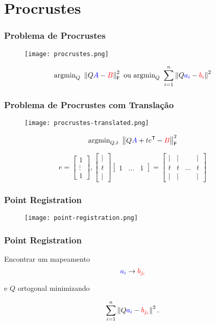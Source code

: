
\section{Procrustes}

\begin{frame}[fragile]
  \frametitle{Problema de Procrustes}
  \begin{figure}
    \centering
    \texttt{[image: procrustes.png]}
  \end{figure}

  \[\text{argmin}_{Q}\,\, \left\lVert Q\textcolor{blue}{A} - \textcolor{red}{B}\right\rVert_\mathsf{F}^2 \text{  ou  } \text{argmin}_{Q}\,\, \sum_{i=1}^{n} \left\lVert Q\textcolor{blue}{a_i} - \textcolor{red}{b_i}\right\rVert^2\]
\end{frame}

\begin{frame}[fragile]
  \frametitle{Problema de Procrustes com Translação}
  \begin{figure}
    \centering
    \texttt{[image: procrustes-translated.png]}
  \end{figure}

  \[\text{argmin}_{Q,t}\,\, \left\lVert Q\textcolor{blue}{A} + t e^{\mathsf{T}\mkern-1mu} - \textcolor{red}{B}\right\rVert_\mathsf{F}^2\]

  \[e = \begin{bmatrix} 1 \\ \vdots \\ 1 \end{bmatrix}, \begin{bmatrix} \vert \\ t \\ \vert \end{bmatrix}\begin{bmatrix} 1 & \dots & 1 \end{bmatrix} = \begin{bmatrix} \vert & \vert & & \vert \\ t & t & \dots & t \\ \vert & \vert & & \vert \end{bmatrix}\]
\end{frame}

\begin{frame}
  \frametitle{Point Registration}
  \begin{figure}
    \centering
    \texttt{[image: point-registration.png]}
  \end{figure}
\end{frame}

\begin{frame}
  \frametitle{Point Registration}
  \begin{center}
    Encontrar um mapeamento \[\textcolor{blue}{a_i} \to \textcolor{red}{b_{j_{i}}}\]

    e $Q$ ortogonal minimizando

    \[\sum_{i=1}^{n} \left\lVert Q\textcolor{blue}{a_{i}} - \textcolor{red}{b_{j_{i}}}\right\rVert^2.\]
  \end{center}
\end{frame}
